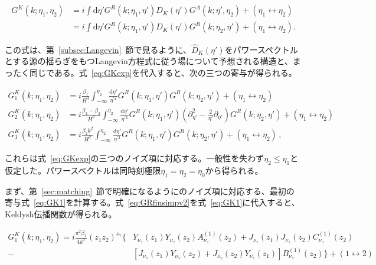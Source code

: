 \documentclass[a4paper,11pt]{ltjsarticle}
\numberwithin{equation}{section}
\newcommand{\dd}{\mathrm{d}}
\newcommand{\Eq}[1]{Eq.~(\ref{#1})}
\newcommand{\Sec}[1]{Sec.~\ref{#1}}
\renewcommand{\Eq}[1]{式~\eqref{#1}}
\renewcommand{\Sec}[1]{第~\ref{#1}~節}
\begin{document}
\begin{align}
     G^K(k; \eta_1,\eta_2) &= i\int \dd \eta' G^R(k; \eta_1,\eta') \widehat{D}_K(\eta' ) G^A(k; \eta',\eta_2) + (\eta_1 \leftrightarrow \eta_2) \\
     &= i \int \dd \eta' G^R(k; \eta_1,\eta') \widehat{D}_K(\eta' ) G^R(k; \eta_2,\eta') + (\eta_1 \leftrightarrow \eta_2).
\end{align}

この式は、\Sec{subsec:Langevin}で見るように、$\widehat D_K(\eta')$をパワースペクトルとする源の揺らぎをもつLangevin方程式に従う場について予想される構造と、まったく同じである。\Eq{eq:GKexp}を代入すると、次の三つの寄与が得られる。

\begin{align}
     G^K_1(k; \eta_1,\eta_2) &= i \frac{\beta_1}{H^4}\int_{-\infty}^{\eta_2} \frac{\dd \eta'}{\eta^{\prime4}} G^R(k; \eta_1,\eta') G^R(k; \eta_2,\eta') + (\eta_1 \leftrightarrow \eta_2) \label{eq:GK1}\\
     G^K_2(k; \eta_1,\eta_2) &= i \frac{\beta_4 - \beta_2}{H^2}\int_{-\infty}^{\eta_2} \frac{\dd \eta'}{\eta^{\prime2}} G^R(k; \eta_1,\eta')\left( \partial_{\eta'}^2 - \frac{2}{\eta'}\partial_{\eta'}\right) G^R(k; \eta_2,\eta') + (\eta_1 \leftrightarrow \eta_2) \label{eq:GK2} \\
     G^K_3(k; \eta_1,\eta_2) &= i \frac{\beta_2 k^2}{H^2}\int_{-\infty}^{\eta_2} \frac{\dd \eta'}{\eta^{\prime2}} G^R(k; \eta_1,\eta') G^R(k; \eta_2,\eta') + (\eta_1 \leftrightarrow \eta_2) \,,\label{eq:GK3}
\end{align}

これらは\Eq{eq:GKexp}の三つのノイズ項に対応する。一般性を失わず$\eta_2\leq\eta_1$と仮定した。パワースペクトルは同時刻極限$\eta_1=\eta_2=\eta_0$から得られる。

まず、\Sec{sec:matching}で明確になるように\cite{LopezNacir:2011kk,Creminelli:2023aly}のノイズ項に対応する、最初の寄与\Eq{eq:GK1}を計算する。\Eq{eq:GRfinsimpv2}を\Eq{eq:GK1}に代入すると、Keldysh伝播関数が得られる。

\begin{align}\label{eq:GKeq}
    G^K_1(k;\eta_1,\eta_2) = i\frac{\pi^2 \beta_1}{4 k^3}  (z_1 z_2)^{\nu_\gamma} \bigg\{& Y_{\nu_\gamma}(z_1) Y_{\nu_\gamma}(z_2) A^{(1)}_{\nu_\gamma}(z_2) + J_{\nu_\gamma}(z_1) J_{\nu_\gamma}(z_2) C^{(1)}_{\nu_\gamma}(z_2) \\
    -& \left[J_{\nu_\gamma}(z_1)Y_{\nu_\gamma}(z_2) + J_{\nu_\gamma}(z_2)Y_{\nu_\gamma}(z_1)\right]B^{(1)}_{\nu_\gamma}(z_2) \bigg\} + (1 \leftrightarrow 2)\nonumber
\end{align}
\end{document}
